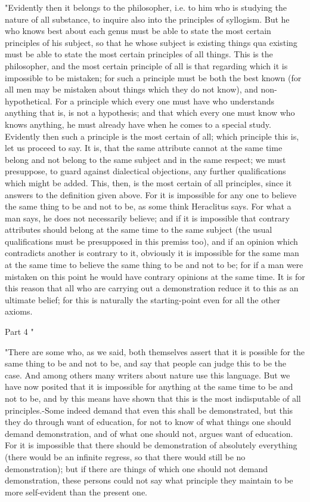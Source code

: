 "Evidently then it belongs to the philosopher, i.e. to him who is
studying the nature of all substance, to inquire also into the principles
of syllogism. But he who knows best about each genus must be able
to state the most certain principles of his subject, so that he whose
subject is existing things qua existing must be able to state the
most certain principles of all things. This is the philosopher, and
the most certain principle of all is that regarding which it is impossible
to be mistaken; for such a principle must be both the best known (for
all men may be mistaken about things which they do not know), and
non-hypothetical. For a principle which every one must have who understands
anything that is, is not a hypothesis; and that which every one must
know who knows anything, he must already have when he comes to a special
study. Evidently then such a principle is the most certain of all;
which principle this is, let us proceed to say. It is, that the same
attribute cannot at the same time belong and not belong to the same
subject and in the same respect; we must presuppose, to guard against
dialectical objections, any further qualifications which might be
added. This, then, is the most certain of all principles, since it
answers to the definition given above. For it is impossible for any
one to believe the same thing to be and not to be, as some think Heraclitus
says. For what a man says, he does not necessarily believe; and if
it is impossible that contrary attributes should belong at the same
time to the same subject (the usual qualifications must be presupposed
in this premiss too), and if an opinion which contradicts another
is contrary to it, obviously it is impossible for the same man at
the same time to believe the same thing to be and not to be; for if
a man were mistaken on this point he would have contrary opinions
at the same time. It is for this reason that all who are carrying
out a demonstration reduce it to this as an ultimate belief; for this
is naturally the starting-point even for all the other axioms.

Part 4 "

"There are some who, as we said, both themselves assert that it is
possible for the same thing to be and not to be, and say that people
can judge this to be the case. And among others many writers about
nature use this language. But we have now posited that it is impossible
for anything at the same time to be and not to be, and by this means
have shown that this is the most indisputable of all principles.-Some
indeed demand that even this shall be demonstrated, but this they
do through want of education, for not to know of what things one should
demand demonstration, and of what one should not, argues want of education.
For it is impossible that there should be demonstration of absolutely
everything (there would be an infinite regress, so that there would
still be no demonstration); but if there are things of which one should
not demand demonstration, these persons could not say what principle
they maintain to be more self-evident than the present one.

